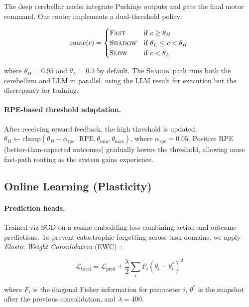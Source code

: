 \documentclass[11pt,a4paper]{article}
\begin{document}
The deep cerebellar nuclei integrate Purkinje outputs and gate the final motor command.
Our router implements a dual-threshold policy:

\begin{equation}
  \text{route}(c) =
  \begin{cases}
    \textsc{Fast} & \text{if } c \geq \theta_H \\
    \textsc{Shadow} & \text{if } \theta_L \leq c < \theta_H \\
    \textsc{Slow} & \text{if } c < \theta_L
  \end{cases}
\end{equation}

where $\theta_H = 0.95$ and $\theta_L = 0.5$ by default.
The \textsc{Shadow} path runs both the cerebellum and LLM in parallel, using the LLM result for execution but the discrepancy for training.

\paragraph{RPE-based threshold adaptation.}
After receiving reward feedback, the high threshold is updated:
$\theta_H \leftarrow \text{clamp}(\theta_H - \alpha_{\text{rpe}} \cdot \text{RPE}, \theta_{\min}, \theta_{\max})$,
where $\alpha_{\text{rpe}} = 0.05$.
Positive RPE (better-than-expected outcomes) gradually lowers the threshold, allowing more fast-path routing as the system gains experience.

\subsection{Online Learning (Plasticity)}\label{sec:learning}

\paragraph{Prediction heads.}
Trained via SGD on a cosine embedding loss combining action and outcome predictions.
To prevent catastrophic forgetting across task domains, we apply \emph{Elastic Weight Consolidation} (EWC)~\citep{kirkpatrick2017overcoming}:

\begin{equation}
  \mathcal{L}_{\text{total}} = \mathcal{L}_{\text{pred}} + \frac{\lambda}{2} \sum_i F_i (\theta_i - \theta_i^*)^2
\end{equation}

where $F_i$ is the diagonal Fisher information for parameter $i$, $\theta^*$ is the snapshot after the previous consolidation, and $\lambda = 400$.
\end{document}
